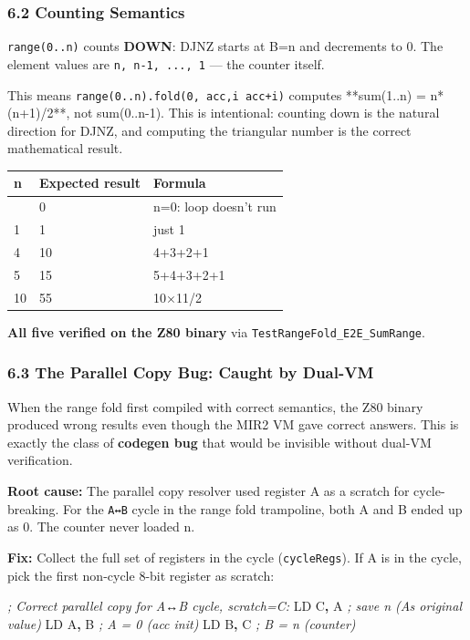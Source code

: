 \documentclass[
  11pt,
  a4paper,
]{report}
\newenvironment{Shaded}{\begin{snugshade}\small}{\end{snugshade}}
\newcommand{\CommentTok}[1]{\textcolor[rgb]{0.56,0.35,0.01}{\textit{#1}}}
\newcommand{\NormalTok}[1]{#1}
\newcommand{\OperatorTok}[1]{\textcolor[rgb]{0.81,0.36,0.00}{\textbf{#1}}}
\begin{document}
\subsubsection{6.2 Counting Semantics}\label{counting-semantics}

\texttt{range(0..n)} counts \textbf{DOWN}: DJNZ starts at B=n and
decrements to 0. The element values are \texttt{n,\ n-1,\ ...,\ 1} ---
the counter itself.

This means
\texttt{range(0..n).fold(0,\ \textbar{}acc,i\textbar{}\ acc+i)} computes
**sum(1..n) = n*(n+1)/2**, not sum(0..n-1). This is intentional:
counting down is the natural direction for DJNZ, and computing the
triangular number is the correct mathematical result.

\begin{longtable}[]{@{}lll@{}}
\toprule\noalign{}
n & Expected result & Formula \\
\midrule\noalign{}
\endhead
\bottomrule\noalign{}
\endlastfoot
0 & 0 & n=0: loop doesn't run \\
1 & 1 & just 1 \\
4 & 10 & 4+3+2+1 \\
5 & 15 & 5+4+3+2+1 \\
10 & 55 & 10×11/2 \\
\end{longtable}

\textbf{All five verified on the Z80 binary} via
\texttt{TestRangeFold\_E2E\_SumRange}.

\subsubsection{6.3 The Parallel Copy Bug: Caught by
Dual-VM}\label{the-parallel-copy-bug-caught-by-dual-vm}

When the range fold first compiled with correct semantics, the Z80
binary produced wrong results even though the MIR2 VM gave correct
answers. This is exactly the class of \textbf{codegen bug} that would be
invisible without dual-VM verification.

\textbf{Root cause:} The parallel copy resolver used register A as a
scratch for cycle-breaking. For the \texttt{A↔B} cycle in the range fold
trampoline, both A and B ended up as 0. The counter never loaded n.

\textbf{Fix:} Collect the full set of registers in the cycle
(\texttt{cycleRegs}). If A is in the cycle, pick the first non-cycle
8-bit register as scratch:

\begin{Shaded}
\begin{Highlighting}[]
\CommentTok{; Correct parallel copy for A↔B cycle, scratch=C:}
\NormalTok{LD C}\OperatorTok{,}\NormalTok{ A     }\CommentTok{; save n (A\textquotesingle{}s original value)}
\NormalTok{LD A}\OperatorTok{,}\NormalTok{ B     }\CommentTok{; A = 0 (acc init)}
\NormalTok{LD B}\OperatorTok{,}\NormalTok{ C     }\CommentTok{; B = n (counter)}
\end{Highlighting}
\end{Shaded}
\end{document}
